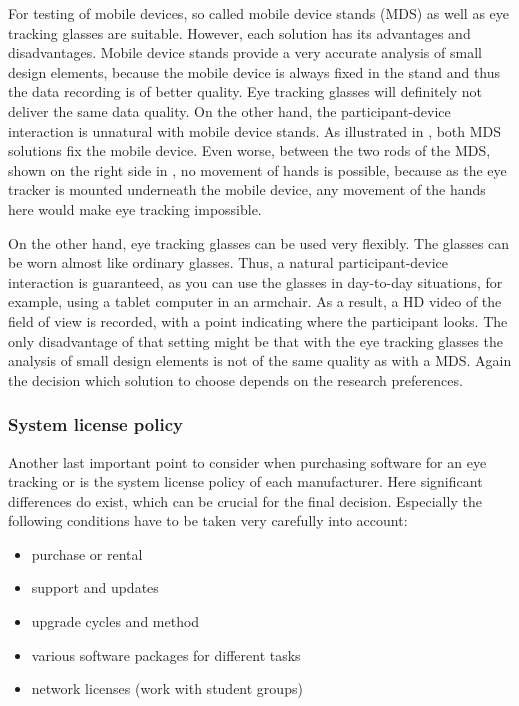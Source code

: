 \documentclass[output=paper]{langsci/langscibook}
\begin{document}
For testing of mobile devices, so called mobile device stands (MDS) as well as eye tracking glasses are suitable. However, each solution has its advantages and disadvantages. Mobile device stands provide a very accurate analysis of small design elements, because the mobile device is always fixed in the stand and thus the data recording is of better quality. Eye tracking glasses will definitely not deliver the same data quality. On the other hand, the participant-device interaction is unnatural with mobile device stands. As illustrated in , both MDS solutions fix the mobile device. Even worse, between the two rods of the MDS, shown on the right side in , no movement of hands is possible, because as the eye tracker is mounted underneath the mobile device, any movement of the hands here would make eye tracking impossible.


On the other hand, eye tracking glasses can be used very flexibly. The glasses can be worn almost like ordinary glasses. Thus, a natural participant-device interaction is guaranteed, as you can use the glasses in day-to-day situations, for example, using a tablet computer in an armchair. As a result, a HD video of the field of view is recorded, with a point indicating where the participant looks. The only disadvantage of that setting might be that with the eye tracking glasses the analysis of small design elements is not of the same quality as with a MDS. Again the decision which solution to choose depends on the research preferences.


\subsubsection{System license policy}

Another last important point to consider when purchasing software for an eye tracking or  is the system license policy of each manufacturer. Here significant differences do exist, which can be crucial for the final decision. Especially the following conditions have to be taken very carefully into account:

\begin{itemize}
\item purchase or rental 
\item support and updates 
\item upgrade cycles and method 
\item various software packages for different tasks 
\item network licenses (work with student groups)
\end{itemize}
\end{document}
